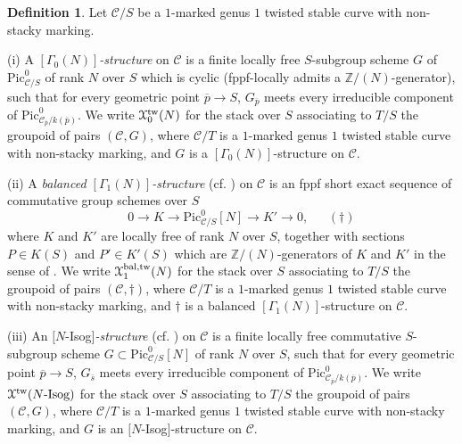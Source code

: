 \documentclass[11pt]{amsart}
\theoremstyle{definition}
\newtheorem{definition}[subsection]{Definition}
\begin{document}
\begin{definition}
Let ${\mathcal{C}}/S$ be a $1$-marked genus $1$ twisted stable curve with non-stacky marking.

(i) A \textit{$[\Gamma_0(N)]$-structure} on ${\mathcal{C}}$ is a finite locally free $S$-subgroup scheme $G$ of $\mathrm{Pic}^0_{{\mathcal{C}}/S}$ of rank $N$ over $S$ which is cyclic (fppf-locally admits a $\mathbb{Z}/(N)$-generator), such that for every geometric point $\overline{p} \rightarrow S$, $G_{\overline{p}}$ meets every irreducible component of $\mathrm{Pic}^0_{{\mathcal{C}}_{\overline{p}}/k(\overline{p})}$. We write ${\mathbf{\EuScript{X}}}^{\mathrm{tw}}_0(N)$ for the stack over $S$ associating to $T/S$ the groupoid of pairs $({\mathcal{C}},G)$, where ${\mathcal{C}}/T$ is a $1$-marked genus $1$ twisted stable curve with non-stacky marking, and $G$ is a $[\Gamma_0(N)]$-structure on ${\mathcal{C}}$.

(ii) A \textit{balanced $[\Gamma_1(N)]$-structure} (cf. \cite[\S3.3]{KM1}) on ${\mathcal{C}}$ is an fppf short exact sequence of commutative group schemes over $S$ 
\begin{displaymath}
\:\:\:\:\:\:\:0 \rightarrow K \rightarrow \mathrm{Pic}^0_{{\mathcal{C}}/S}[N] \rightarrow K' \rightarrow 0,\:\:\:\:\:\:\: (\dagger)
\end{displaymath}
where $K$ and $K'$ are locally free of rank $N$ over $S$, together with sections $P \in K(S)$ and $P' \in K'(S)$ which are $\mathbb{Z}/(N)$-generators of $K$ and $K'$ in the sense of \cite[\S1.4]{KM1}. We write ${\mathbf{\EuScript{X}}}^{\mathrm{bal,tw}}_1(N)$ for the stack over $S$ associating to $T/S$ the groupoid of pairs $({\mathcal{C}},\dagger)$, where ${\mathcal{C}}/T$ is a $1$-marked genus $1$ twisted stable curve with non-stacky marking, and $\dagger$ is a balanced $[\Gamma_1(N)]$-structure on ${\mathcal{C}}$.

(iii) An $[N$-Isog$]$\textit{-structure} (cf. \cite[\S6.5]{KM1}) on ${\mathcal{C}}$ is a finite locally free commutative $S$-subgroup scheme $G \subset \mathrm{Pic}^0_{{\mathcal{C}}/S}[N]$ of rank $N$ over $S$, such that for every geometric point $\overline{p} \rightarrow S$, $G_{\overline{s}}$ meets every irreducible component of $\mathrm{Pic}^0_{{\mathcal{C}}_{\overline{p}}/k(\overline{p})}$. We write ${\mathbf{\EuScript{X}}}^{\mathrm{tw}}(N\textrm{-Isog})$ for the stack over $S$ associating to $T/S$ the groupoid of pairs $({\mathcal{C}},G)$, where ${\mathcal{C}}/T$ is a $1$-marked genus $1$ twisted stable curve with non-stacky marking, and $G$ is an $[N$-Isog$]$-structure on ${\mathcal{C}}$.


\end{definition}
\end{document}
